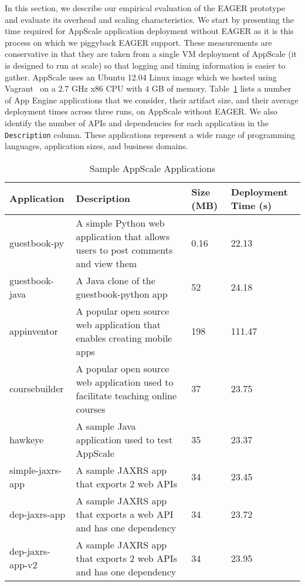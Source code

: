 In this section, we describe our empirical evaluation of the EAGER
prototype and evaluate its overhead and scaling characteristics.
We start by presenting the time required for AppScale application deployment
without EAGER as it is this process on which we piggyback EAGER support.  
These measurements are conservative in that they are taken 
from a single VM deployment of AppScale (it is designed to run at scale) so that
logging and timing information is easier to gather.  AppScale uses an
Ubuntu 12.04 Linux image which we hosted using Vagrant~\cite{vagrant}    
on a $2.7$ GHz x86 CPU with $4$ GB of memory.
Table~\ref{tab:sample_apps} lists a number of App Engine
applications that we consider, their artifact size, and their average deployment times 
across three runs, on AppScale without EAGER.
We also identify the number of APIs and dependencies for each 
application in the \texttt{Description} column.
These applications represent a wide range of programming languages,
application sizes, and business domains.  

\begin{table}[t]
\begin{center}
\begin{tabular}{| p{1.5cm} | p{3.2cm} | p{0.5cm} | p{1.1cm} | }
\hline
Application & Description & Size (MB) & Deployment Time (s) \\ \hline
guestbook-py & A simple Python web application that allows users to post
comments and view them & 0.16 & 22.13 \\ \hline
guestbook-java & A Java clone of the guestbook-python app & 52 & 24.18 \\ \hline
appinventor & A popular open source web application that enables creating mobile apps & 198 & 111.47 \\ \hline
coursebuilder & A popular open source web application used to facilitate teaching online courses & 37 & 23.75 \\ \hline
hawkeye & A sample Java application used to test AppScale & 35 & 23.37 \\ \hline
simple-jaxrs-app & A sample JAXRS app that exports 2 web APIs & 34 & 23.45 \\ \hline
dep-jaxrs-app & A sample JAXRS app that exports a web API and has one dependency & 34 & 23.72 \\ \hline
dep-jaxrs-app-v2 & A sample JAXRS app that exports 2 web APIs and has one dependency & 34 & 23.95 \\ \hline
\end{tabular}
\end{center}
\caption{Sample AppScale Applications}
\label{tab:sample_apps}
\end{table}

